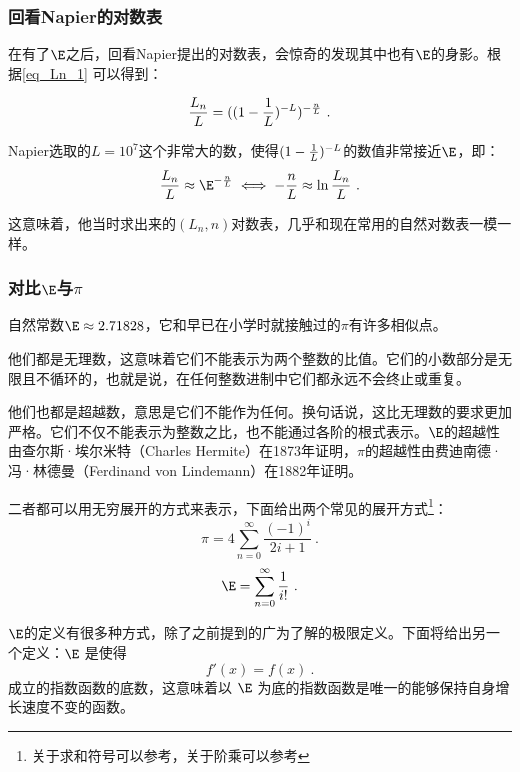 \subsubsection{回看Napier的对数表}

在有了$\E$之后，回看Napier提出的对数表，会惊奇的发现其中也有$\E$的身影。根据\autoref{eq_Ln_1} 可以得到：

\begin{equation}
{L_n\over L}=((1-{1\over L})^{-L})^{-{n\over L}}~.
\end{equation}

Napier选取的$L=10^7$这个非常大的数，使得$(1-{1\over L})^{-L}$的数值非常接近$\E$，即：
\begin{equation}
{L_n\over L}\approx\E^{-{n\over L}}\iff-{n\over L}\approx\ln{L_n\over L}~.
\end{equation}

这意味着，他当时求出来的$(L_n,n)$对数表，几乎和现在常用的自然对数表一模一样。

\subsubsection{对比$\E$与$\pi$}

自然常数$\E \approx 2.71828$，它和早已在小学时就接触过的$\pi$有许多相似点。

他们都是无理数，这意味着它们不能表示为两个整数的比值。它们的小数部分是无限且不循环的，也就是说，在任何整数进制中它们都永远不会终止或重复。

他们也都是超越数，意思是它们不能作为任何。换句话说，这比无理数的要求更加严格。它们不仅不能表示为整数之比，也不能通过各阶的根式表示。$\E$的超越性由查尔斯·埃尔米特（Charles Hermite）在1873年证明，$\pi$的超越性由费迪南德·冯·林德曼（Ferdinand von Lindemann）在1882年证明。

二者都可以用无穷展开的方式来表示，下面给出两个常见的展开方式\footnote{关于求和符号可以参考，关于阶乘可以参考}：
\begin{equation}
\pi=4\sum_{n=0}^\infty\frac{(-1)^i}{2i+1}~.
\end{equation}
\begin{equation}
\E=\sum_{n=0}^\infty\frac{1}{i!}~.
\end{equation}

$\E$的定义有很多种方式，除了之前提到的广为了解的极限定义。下面将给出另一个定义：$\E$ 是使得
\begin{equation}
f'(x) = f(x)~.
\end{equation}
成立的指数函数的底数，这意味着以 $\E$ 为底的指数函数是唯一的能够保持自身增长速度不变的函数。

